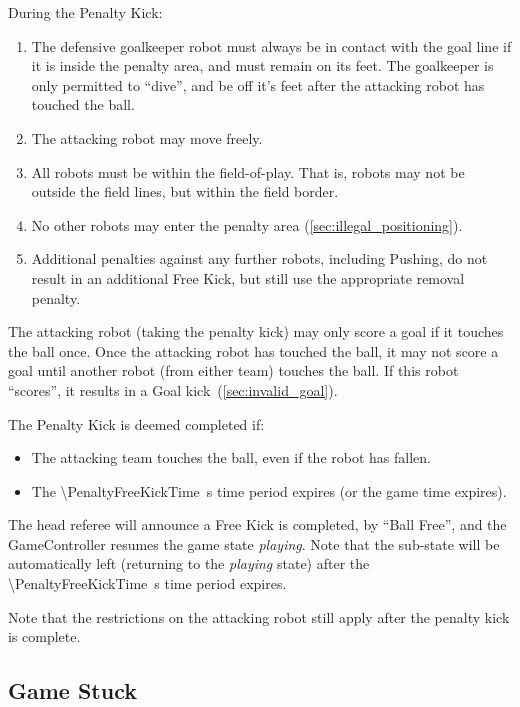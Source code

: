 During the Penalty Kick:
\begin{enumerate}
    \item The defensive goalkeeper robot must always be in contact with the goal line if it is inside the penalty area, and must remain on its feet. The goalkeeper is only permitted to ``dive'', and be off it's feet after the attacking robot has touched the ball.
    \item The attacking robot may move freely.
    \item All robots must be within the field-of-play. That is, robots may not be outside the field lines, but within the field border.
    \item No other robots may enter the penalty area (\cf \cref{sec:illegal_positioning}).
    \item Additional penalties against any further robots, including Pushing, do not result in an additional Free
    Kick, but still use the appropriate removal penalty.
\end{enumerate}

The attacking robot (taking the penalty kick) may only score a goal if it touches the ball once.
Once the attacking robot has touched the ball, it may not score a goal until another robot (from either team) touches the ball.
If this robot ``scores'', it results in a Goal kick~(\cf \cref{sec:invalid_goal}).

The Penalty Kick is deemed completed if:
\begin{itemize}
\item The attacking team touches the ball, even if the robot has fallen.
\item The \qty{\PenaltyFreeKickTime}{\second} time period expires (or the game time expires).
\end{itemize}

The head referee will announce a Free Kick is completed, by ``Ball Free'', and the GameController
resumes the game state \emph{playing}. Note that the sub-state will be automatically left (returning to the \textit{playing} state) after the \qty{\PenaltyFreeKickTime}{\second} time period expires.

Note that the restrictions on the attacking robot still apply after the penalty kick is complete.

\subsection{Game Stuck}
\label{sec:game_stuck}

